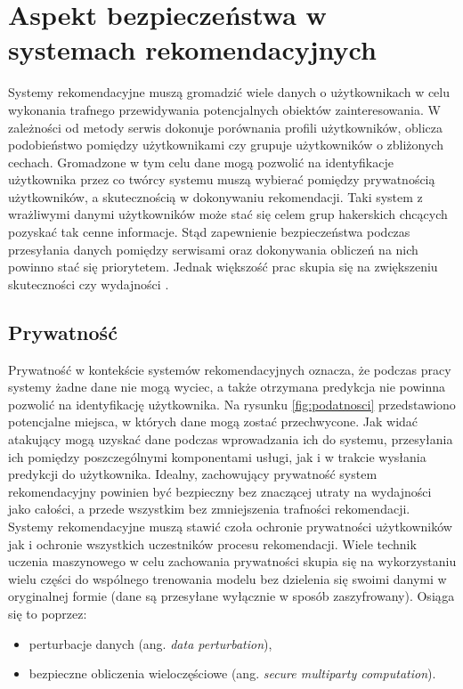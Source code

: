 \chapter{Aspekt bezpieczeństwa w systemach rekomendacyjnych}
Systemy rekomendacyjne muszą gromadzić wiele danych o użytkownikach w celu wykonania trafnego przewidywania potencjalnych obiektów zainteresowania. W zależności od metody serwis dokonuje porównania  profili użytkowników, oblicza podobieństwo pomiędzy użytkownikami czy grupuje użytkowników o zbliżonych cechach. Gromadzone w tym celu dane mogą pozwolić na identyfikacje użytkownika przez co twórcy systemu muszą wybierać pomiędzy prywatnością użytkowników, a skutecznością w dokonywaniu rekomendacji. Taki system z wrażliwymi danymi użytkowników może stać się celem grup hakerskich chcących pozyskać tak cenne informacje. Stąd zapewnienie bezpieczeństwa podczas przesyłania danych pomiędzy serwisami oraz dokonywania obliczeń na nich powinno stać się priorytetem. Jednak większość prac skupia się na zwiększeniu skuteczności czy wydajności \cite{recent_developments}.

\section{Prywatność}
Prywatność w kontekście systemów rekomendacyjnych oznacza, że podczas pracy systemy żadne dane nie mogą wyciec, a także otrzymana predykcja nie powinna pozwolić na identyfikację użytkownika. Na rysunku \ref{fig:podatnosci} przedstawiono potencjalne miejsca, w których dane mogą zostać przechwycone. Jak widać atakujący mogą uzyskać dane podczas wprowadzania ich do systemu, przesyłania ich pomiędzy poszczególnymi komponentami usługi, jak i w trakcie wysłania predykcji do użytkownika. Idealny, zachowujący prywatność system rekomendacyjny powinien być bezpieczny bez znaczącej utraty na wydajności jako całości, a przede wszystkim bez zmniejszenia trafności rekomendacji. Systemy rekomendacyjne muszą stawić czoła ochronie prywatności użytkowników jak i ochronie wszystkich uczestników procesu rekomendacji. Wiele technik uczenia maszynowego w celu zachowania prywatności skupia się na wykorzystaniu wielu części do wspólnego trenowania modelu bez dzielenia się swoimi danymi w oryginalnej formie (dane są przesyłane wyłącznie w sposób zaszyfrowany). Osiąga się to poprzez:
\begin{itemize}
    \item perturbacje danych (ang. \textit{data perturbation}),
    \item bezpieczne obliczenia wieloczęściowe (ang. \textit{secure multiparty computation}).
\end{itemize}

